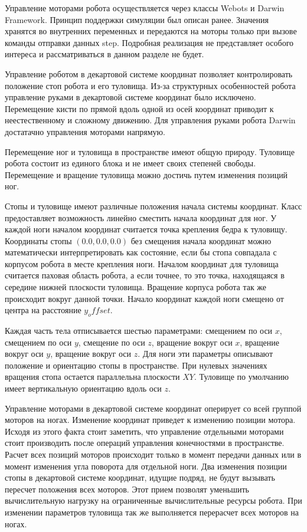 Управление моторами робота осуществляется через классы  Webots и Darwin Framework. Принцип поддержки симуляции был описан ранее. Значения хранятся во внутренних переменных и передаются на моторы только при вызове команды отправки данных step. Подробная реализация не представляет особого интереса и рассматриваться в данном разделе не будет.

Управление роботом в декартовой системе координат позволяет контролировать положение стоп робота и его туловища. Из-за структурных особенностей робота управление руками в декартовой системе координат было исключено. Перемещение кисти по прямой вдоль одной из осей координат приводит к неестественному и сложному движению. Для управления руками робота Darwin достатачно управления моторами напрямую.

Перемещение ног и туловища в пространстве имеют общую природу. Туловище робота состоит из единого блока и не имеет своих степеней свободы. Перемещение и вращение туловища можно достичь путем изменения позиций ног. 

Стопы и туловище имеют различные положения начала системы координат. Класс предоставляет возможность линейно сместить начала координат для ног. У каждой ноги началом координат считается точка крепления бедра к туловищу. Координаты стопы $(0.0, 0.0, 0.0)$ без смещения начала координат можно математически интерпретировать как состояние, если бы стопа совпадала с корпусом робота в месте крепления ноги. Началом координат для туловища считается паховая область робота, а если точнее, то это точка, находящаяся в середине нижней плоскости туловища. Вращение корпуса робота так же происходит вокруг данной точки. Начало координат каждой ноги смещено от центра на расстояние $y_offset$.

Каждая часть тела отписывается шестью параметрами: смещением по оси $x$, смещением по оси $y$, смещение по оси $z$, вращение вокруг оси $x$, вращение вокруг оси $y$, вращение вокруг оси $z$. Для ноги эти параметры описывают положение и ориентацию стопы в пространстве. При нулевых значениях вращения стопа остается параллельна плоскости $XY$. Туловище по умолчанию имеет вертикальную ориентацию вдоль оси $z$.

Управление моторами в декартовой системе координат оперирует со всей группой моторов на ногах. Изменение координат приведет к изменению позиции мотора. Исходя из этого факта стоит заметить, что управление отдельными моторами стоит производить после операций управления конечностями в пространстве. Расчет всех позиций моторов происходит только в момент передачи данных или в момент изменения угла поворота для отдельной ноги. Два изменения позиции стопы в декартовой системе координат, идущие подряд, не будут вызывать пересчет положения всех моторов. Этот прием позволят уменьшить вычислительную нагрузку на ограниченные вычислительные ресурсы робота. При изменении параметров туловища  так же выполняется перерасчет всех моторов на ногах.

